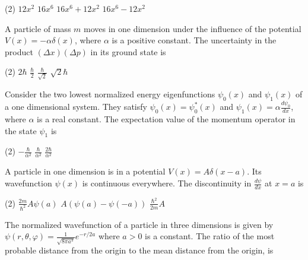 \begin{enumerate}
\begin{minipage}{\textwidth}
\end{minipage}
\begin{tasks}(2)
	\task[\textbf{A.}] $12 x^{2}$
	\task[\textbf{B.}]$16 x^{6}$
	\task[\textbf{C.}]$16 x^{6}+12 x^{2}$
	\task[\textbf{D.}]$16 x^{6}-12 x^{2}$
\end{tasks}
\begin{minipage}{\textwidth}
	\item A particle of mass $m$ moves in one dimension under the influence of the potential $V(x)=-\alpha \delta(x)$, where $\alpha$ is a positive constant. The uncertainty in the product $(\Delta x)(\Delta p)$ in its ground state is
\end{minipage}
\begin{tasks}(2)
	\task[\textbf{A.}] $2 \hbar$
	\task[\textbf{B.}]$\frac{\hbar}{2}$
	\task[\textbf{C.}]$\frac{\hbar}{\sqrt{2}}$
	\task[\textbf{D.}]$\sqrt{2} \hbar$
\end{tasks}
\begin{minipage}{\textwidth}
	\item Consider the two lowest normalized energy eigenfunctions $\psi_{0}(x)$ and $\psi_{1}(x)$ of a one dimensional system. They satisfy $\psi_{0}(x)=\psi_{0}^{*}(x)$ and $\psi_{1}(x)=\alpha \frac{d \psi_{0}}{d x}$, where $\alpha$ is a real constant. The expectation value of the momentum operator in the state $\psi_{1}$ is
\end{minipage}
\begin{tasks}(2)
	\task[\textbf{A.}] $-\frac{\hbar}{\alpha^{2}}$
	\task[\textbf{C.}]$\frac{\hbar}{\alpha^{2}}$
	\task[\textbf{D.}]$\frac{2 \hbar}{\alpha^{2}}$
\end{tasks}
\begin{minipage}{\textwidth}
	\item A particle in one dimension is in a potential $V(x)=A \delta(x-a)$. Its wavefunction $\psi(x)$ is continuous everywhere. The discontinuity in $\frac{d \psi}{d x}$ at $x=a$ is
\end{minipage}
\begin{tasks}(2)
	\task[\textbf{A.}] $\frac{2 m}{\hbar^{2}} A \psi(a)$
	\task[\textbf{B.}]$A(\psi(a)-\psi(-a))$
	\task[\textbf{C.}]$\frac{\hbar^{2}}{2 m} A$
\end{tasks}
\begin{minipage}{\textwidth}
	\item The normalized wavefunction of a particle in three dimensions is given by $\psi(r, \theta, \varphi)=\frac{1}{\sqrt{8 \pi a^{3}}} e^{-r / 2 a}$ where $a>0$ is a constant. The ratio of the most probable distance from the origin to the mean distance from the origin, is

\end{minipage}
\end{enumerate}
